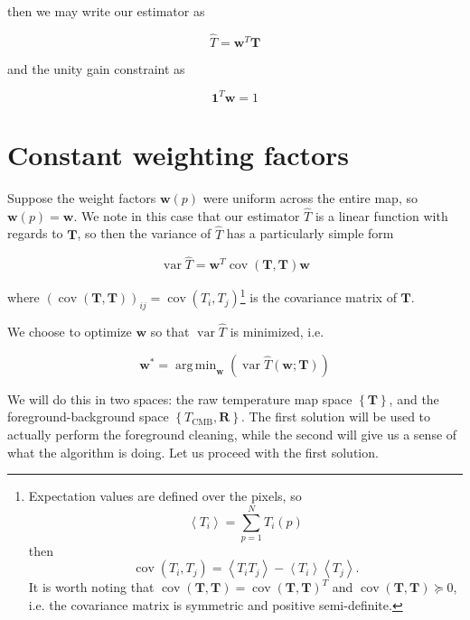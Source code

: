\documentclass[twoside,10pt]{article}
\DeclareMathOperator{\vvar}{var}
\DeclareMathOperator{\cvar}{cov}
\DeclareMathOperator*{\argmin}{arg\,min}
\newcommand{\ve}[1]{\mathbf{#1}}
\newcommand{\Avg}[1]{\left< #1 \right>}
\newcommand{\pc}[1]{\left\{ #1 \right\} }
\newcommand{\Tcmb}[0]{T_\mathrm{CMB}}
\newcommand{\hT}[0]{\hat{T}}
\newcommand{\cov}[1]{\cvar{\left(#1\right)}}
\newcommand{\varhT}[0]{\vvar{\hat{T}}}
\newcommand{\vw}[0]{\ve{w}}
\newcommand{\vT}[0]{\ve{T}}
\begin{document}
then we may write our estimator as

\begin{equation}
    \hT = \vw^T \vT
\end{equation}

and the unity gain constraint as

\begin{equation}
    \ve{1}^T \vw = 1
\end{equation}

\section{Constant weighting factors}
\label{sec:constant_weighting_factors}

Suppose the weight factors $\vw(p)$ were uniform across the entire map, so
$\vw(p) = \vw$. We note in this case that our estimator $\hT$ is a
linear function with regards to $\vT$, so then the variance of $\hT$ has a
particularly simple form

\begin{equation}
    \varhT = \vw^T \cov{\vT, \vT} \vw
\end{equation}

where $\left(\cov{\vT, \vT}\right)_{ij} = \cov{T_i, T_j}$\footnote{
Expectation values are defined over the pixels, so
\begin{equation*}
    \Avg{T_i} = \sum_{p=1}^N T_i(p)
\end{equation*}
then
\begin{equation*}
    \cov{T_i, T_j} = \Avg{T_i T_j} - \Avg{T_i}\Avg{T_j}.
\end{equation*}
It is worth noting that $\cov{\vT, \vT} = \cov{\vT, \vT}^T$ and
$\cov{\vT, \vT} \succeq 0$, i.e. the covariance matrix is symmetric and
positive semi-definite.} is the covariance matrix of $\vT$.

We choose to optimize $\vw$ so that $\varhT$ is minimized, i.e.

\begin{equation}
    \vw^* = \argmin_{\vw} \left( \varhT(\vw; \vT) \right)
\end{equation}

We will do this in two spaces: the raw temperature map space $\pc{\vT}$, and
the foreground-background space $\pc{\Tcmb, \ve{R}}$. The first solution will
be used to actually perform the foreground cleaning, while the second will
give us a sense of what the algorithm is doing. Let us proceed with the first
solution.
\end{document}
